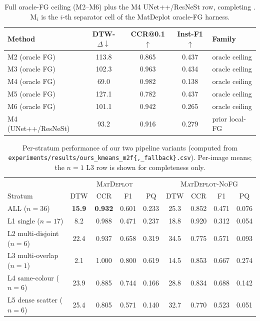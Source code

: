 \documentclass{article}
\begin{document}
\begin{table}[h]
\centering
\caption{Full oracle-FG ceiling (M2--M6) plus the M4 UNet++/ResNeSt
row, completing . M$_i$ is the $i$-th separator
cell of the MatDeplot oracle-FG harness.}
\label{tab:t1-all-full}
\small
\begin{tabular}{lcccl}
\toprule
Method & DTW-$\Delta\downarrow$ & CCR@0.1$\uparrow$ &
Inst-F1$\uparrow$ & Family \\
\midrule
M2 (oracle FG) & 113.8 & 0.865 & 0.437 & oracle ceiling \\
M3 (oracle FG) & 102.3 & 0.963 & 0.434 & oracle ceiling \\
M4 (oracle FG) &  69.0 & 0.982 & 0.138 & oracle ceiling \\
M5 (oracle FG) & 127.1 & 0.782 & 0.437 & oracle ceiling \\
M6 (oracle FG) & 101.1 & 0.942 & 0.265 & oracle ceiling \\
M4 (UNet++/ResNeSt) & 93.2 & 0.916 & 0.279 & prior local-FG \\
\bottomrule
\end{tabular}
\end{table}

\begin{table}[h]
\centering
\caption{Per-stratum performance of our two pipeline variants
(computed from \texttt{experiments/results/ours\_kmeans\_m2f\{,\_fallback\}.csv}).
Per-image means; the $n{=}1$ L3 row is shown for completeness only.}
\label{tab:t1-strata}
\small
\begin{tabular}{lcccc|cccc}
\toprule
& \multicolumn{4}{c|}{\textsc{MatDeplot}} &
  \multicolumn{4}{c}{\textsc{MatDeplot-NoFG}} \\
Stratum              & DTW & CCR & F1 & PQ &
                       DTW & CCR & F1 & PQ \\
\midrule
ALL ($n{=}36$)                   & \textbf{15.9} & \textbf{0.932} & 0.601 & 0.233 &
                                   25.3 & 0.852 & 0.471 & 0.076 \\
L1 single ($n{=}17$)             & 8.2   & 0.988 & 0.471 & 0.237 &
                                   18.8  & 0.920 & 0.312 & 0.054 \\
L2 multi-disjoint ($n{=}6$)      & 22.4  & 0.937 & 0.658 & 0.319 &
                                   34.5  & 0.775 & 0.571 & 0.093 \\
L3 multi-overlap ($n{=}1$)       & 2.1   & 1.000 & 0.800 & 0.619 &
                                   14.5  & 0.853 & 0.667 & 0.274 \\
L4 same-colour ($n{=}6$)         & 23.9  & 0.885 & 0.744 & 0.166 &
                                   28.8  & 0.834 & 0.688 & 0.142 \\
L5 dense scatter ($n{=}6$)       & 25.4  & 0.805 & 0.571 & 0.140 &
                                   32.7  & 0.770 & 0.523 & 0.051 \\
\bottomrule
\end{tabular}
\end{table}
\end{document}
